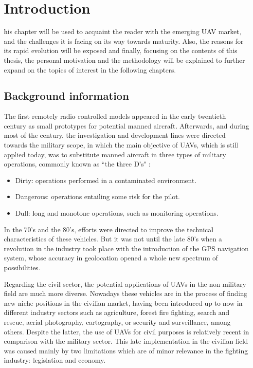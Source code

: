 %
%
\let\textcircled=\pgftextcircled
\chapter{Introduction}

his chapter will be used to acquaint the reader with the emerging UAV market, and the challenges it is facing on its way towards maturity.
Also, the reasons for its rapid evolution will be exposed and finally, focusing on the contents of this thesis, the personal motivation and the methodology will be explained to further expand on the topics of interest in the following chapters.

\section{Background information} \label{sec:background}

The first remotely radio controlled models appeared in the early twentieth century as small prototypes for potential manned aircraft. 
Afterwards, and during most of the century, the investigation and development lines were directed towards the military scope, in which the main objective of UAVs, which is still applied today, was to substitute manned aircraft in three types of military operations, commonly known as ``the three D's" \cite{daily2015,uasapplications2016}:

\begin{itemize}
	\item Dirty: operations performed in a contaminated environment.
	\item Dangerous: operations entailing some risk for the pilot.
	\item Dull: long and monotone operations, such as monitoring operations.
\end{itemize}

In the 70's and the 80's, efforts were directed to improve the technical characteristics of these vehicles.
But it was not until the late 80's when a revolution in the industry took place with the introduction of the GPS navigation system, whose accuracy in geolocation opened a whole new spectrum of possibilities.

Regarding the civil sector, the potential applications of UAVs in the non-military field are much more diverse.
Nowadays these vehicles are in the process of finding new niche positions in the civilian market, having been introduced up to now in different industry sectors such as agriculture, forest fire fighting, search and rescue, aerial photography, cartography, or security and surveillance, among others. 
Despite the latter, the use of UAVs for civil purposes is relatively recent in comparison with the military sector.
This late implementation in the civilian field was caused mainly by two limitations which are of minor relevance in the fighting industry: legislation and economy.
\cite{aguado2016}

